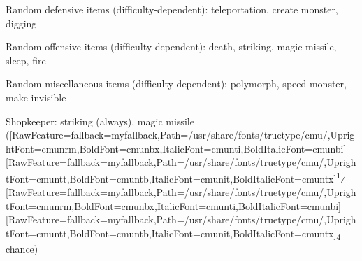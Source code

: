 \begin{myitemize}\item{}Random defensive items\footnotemark[52] (difficulty-{}dependent): teleportation\footnotemark[53], create monster\footnotemark[54],  digging\footnotemark[55]
\item{}Random offensive items\footnotemark[56] (difficulty-{}dependent): death\footnotemark[57], striking\footnotemark[58], magic missile\footnotemark[59], sleep\footnotemark[60],  fire\footnotemark[61]
\item{}Random miscellaneous items\footnotemark[62] (difficulty-{}dependent): polymorph\footnotemark[63], speed monster\footnotemark[64],  make invisible\footnotemark[65]
\item{}Shopkeeper\footnotemark[66]: striking (always), magic missile (\allowbreak{}\setmainfont{cmunrm.ttf}[RawFeature={fallback=myfallback},Path=/usr/share/fonts/truetype/cmu/,UprightFont=cmunrm,BoldFont=cmunbx,ItalicFont=cmunti,BoldItalicFont=cmunbi]\setmonofont{cmunrm.ttf}[RawFeature={fallback=myfallback},Path=/usr/share/fonts/truetype/cmu/,UprightFont=cmuntt,BoldFont=cmuntb,ItalicFont=cmunit,BoldItalicFont=cmuntx]\textsuperscript{1}⁄\allowbreak{}\setmainfont{cmunrm.ttf}[RawFeature={fallback=myfallback},Path=/usr/share/fonts/truetype/cmu/,UprightFont=cmunrm,BoldFont=cmunbx,ItalicFont=cmunti,BoldItalicFont=cmunbi]\setmonofont{cmunrm.ttf}[RawFeature={fallback=myfallback},Path=/usr/share/fonts/truetype/cmu/,UprightFont=cmuntt,BoldFont=cmuntb,ItalicFont=cmunit,BoldItalicFont=cmuntx]\textsubscript{4} chance)

\end{myitemize}
